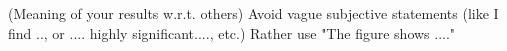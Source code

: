 (Meaning of your results w.r.t. others)
Avoid vague subjective statements (like I find .., or .... highly significant...., etc.)
Rather use "The figure shows ...."